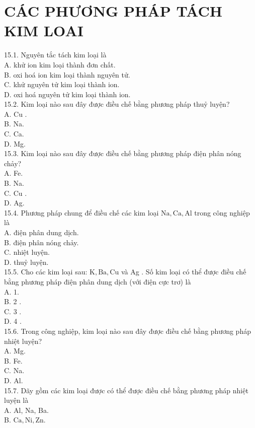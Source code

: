 \documentclass[10pt]{article}
\begin{document}
\section*{CÁC PHƯƠNG PHÁP TÁCH KIM LOAI}
15.1. Nguyên tắc tách kim loại là\\
A. khử ion kim loại thành đơn chất.\\
B. oxi hoá ion kim loại thành nguyên tử.\\
C. khử nguyên tử kim loại thành ion.\\
D. oxi hoá nguyên tử kim loại thành ion.\\
15.2. Kim loại nào sau đây được điều chế bằng phương pháp thuỷ luyện?\\
A. Cu .\\
B. Na.\\
C. Ca.\\
D. Mg.\\
15.3. Kim loại nào sau đây được điều chế bằng phương pháp điện phân nóng chảy?\\
A. Fe.\\
B. Na.\\
C. Cu .\\
D. Ag.\\
15.4. Phương pháp chung để điều chế các kim loại $\mathrm{Na}, \mathrm{Ca}, \mathrm{Al}$ trong công nghiệp là\\
A. điện phân dung dịch.\\
B. điện phân nóng chảy.\\
C. nhiệt luyện.\\
D. thuỷ luyện.\\
15.5. Cho các kim loại sau: $\mathrm{K}, \mathrm{Ba}, \mathrm{Cu}$ và Ag . Số kim loại có thể được điều chế bằng phương pháp điện phân dung dịch (với điện cực trơ) là\\
A. 1.\\
B. 2 .\\
C. 3 .\\
D. 4 .\\
15.6. Trong công nghiệp, kim loại nào sau đây được điều chế bằng phương pháp nhiệt luyện?\\
A. Mg.\\
B. Fe.\\
C. Na.\\
D. Al.\\
15.7. Dãy gồm các kim loại được có thể được điều chế bằng phương pháp nhiệt luyện là\\
A. Al, Na, Ba.\\
B. $\mathrm{Ca}, \mathrm{Ni}, \mathrm{Zn}$.\\
\end{document}
